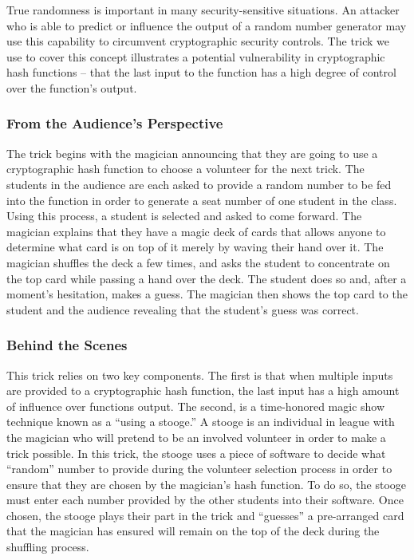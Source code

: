 True randomness is important in many
security-sensitive situations.
An attacker who is able to predict or influence the output of a random number
generator may use this capability to circumvent cryptographic security controls.
The trick we use to cover this concept
illustrates a potential vulnerability in cryptographic hash functions
-- that the last input to the function has a high degree of control over
the function's output.


\subsubsection{From the Audience's Perspective}

The trick begins with the magician announcing that they are going to use a
cryptographic hash function to choose a volunteer for the next trick.  The
students in the audience are each asked to provide a random number to
be
fed into the function in order to generate a seat number of one student in the
class.  Using this process, a student is selected and asked to come
forward.
The magician explains that they have a magic deck of cards that allows
anyone to determine what card is on top of it merely by waving their hand over
it.  The magician shuffles the deck a few times,
and asks the student
to concentrate on the top card while passing
a hand over the deck.
The student does so and, after a
moment's hesitation, makes a guess.  The magician then shows the top card to the
student and the audience revealing that the student's guess was correct.

\subsubsection{Behind the Scenes}

This trick relies on two key components.  The first is that when
multiple inputs are provided to a cryptographic hash function, the last input
has a high amount of influence over functions output.
The second, is a time-honored
magic show technique known as a ``using a stooge.''
A stooge is an individual in league with
the magician who will pretend to be an involved volunteer in order to make a
trick possible.  In this trick, the stooge uses a piece of software to decide
what ``random'' number to provide during the volunteer selection process in
order to ensure that they are chosen by the magician's hash function.  To do so,
the stooge must enter each number provided by the other students into their
software.  Once chosen, the stooge plays their part in the trick and ``guesses''
a pre-arranged card that the magician has ensured will remain on the top of the
deck during the shuffling process.

